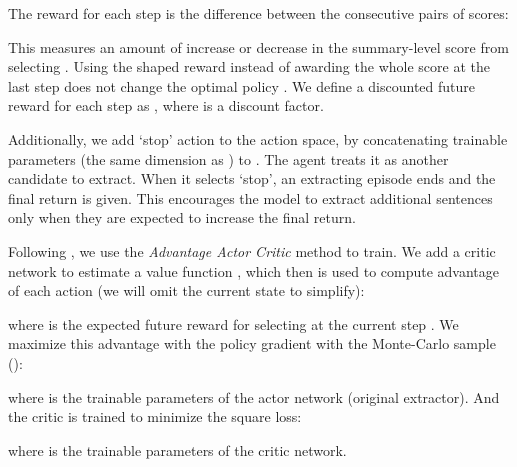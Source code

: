 \documentclass[11pt,a4paper]{article}
\begin{document}
The reward for each step  is the difference between the consecutive pairs of scores:

This measures an amount of increase or decrease in the
summary-level score from selecting .
Using the shaped reward  instead of awarding the whole score
 at the last step does not change the optimal policy \cite{Ng:1999:PIU:645528.657613}.
We define a discounted future reward for each step as
, where  is a discount factor.

Additionally, we add `stop' action to the action space, by concatenating
trainable parameters  (the same dimension as )
to . The agent treats it as another candidate to extract. When it selects
`stop', an extracting episode ends and the final return is given.
This encourages the model to extract additional sentences only when they
are expected to increase the final return.

Following \citet{chen-bansal-2018-fast}, we use the
\emph{Advantage Actor Critic} \cite{mnih2016asynchronous} method to train.
We add a critic network to estimate a value function
, which
then is used to compute advantage of each action
(we will omit the current state  to simplify):

where  is the expected future reward for selecting  at the current step .
We maximize this advantage with the policy gradient with the Monte-Carlo sample
():

where  is the trainable parameters of the actor network (original extractor).
And the critic is trained to minimize the square loss:

where  is the trainable parameters of the critic network.
\end{document}
